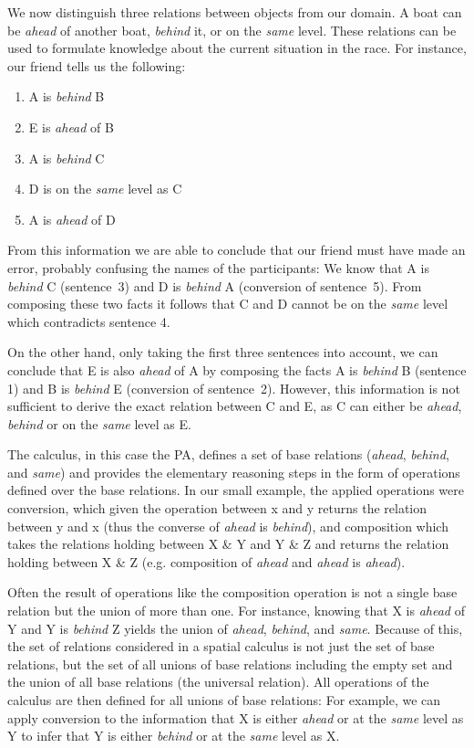 \documentclass[headsepline]{scrreprt}
\theoremstyle{definition}
\begin{document}
We now distinguish three relations between objects from
our domain. A boat can be \emph{ahead} of another boat, \emph{behind} it,
or on the \emph{same} level. These relations can be used to formulate
knowledge about the current situation in the race. For instance, our
friend tells us the following:

\begin{enumerate}
\item A is \emph{behind} B
\item E is \emph{ahead} of B
\item A is \emph{behind} C
\item D is on the \emph{same} level as C
\item A is \emph{ahead} of D
\end{enumerate}
From this information we are able to conclude that our friend must have
made an error, probably confusing the names of the participants: We know
that A is \emph{behind} C (sentence~3) and D is \emph{behind} A (conversion of sentence~5). From
composing these two facts it follows that C and D cannot be on the \emph{same}
level which contradicts sentence 4.

On the other hand, only taking the first three sentences into account, we can conclude that E
is also \emph{ahead} of A by composing
the facts A is \emph{behind} B (sentence 1) and B is \emph{behind} E (conversion of sentence~2).
However, this information is not sufficient to derive the exact
relation
between C and E, as C can either be \emph{ahead}, \emph{behind} or on the {\em
same} level as E.

The calculus, in this case the PA, defines a set of base relations
(\emph{ahead}, \emph{behind}, and \emph{same}) and
provides the elementary reasoning steps in the form of operations defined
over the base relations. In our small example, the applied
operations were conversion, which given the operation between x and y returns
the relation between y and x (thus the converse of \emph{ahead} is
\emph{behind}), and composition which takes the relations holding
between X \& Y and Y \& Z and returns the relation holding between X \& Z (e.g.
composition of \emph{ahead} and \emph{ahead} is \emph{ahead}).

Often the result of operations like the composition operation is
not a single base relation but the union of more than one. For
instance, knowing that X is \emph{ahead} of Y and Y is \emph{behind}
Z yields the union of \emph{ahead}, \emph{behind}, and \emph{same}.
Because of this, the set of relations considered in a spatial
calculus is not just the set of base relations, but the set
of all unions of base relations including the empty set and
the union of all base relations (the universal relation).
All operations of the calculus are then defined for all unions
of base relations: For example, we can apply conversion to
the information that X is either \emph{ahead} or at the
\emph{same} level as Y to infer that Y is either \emph{behind}
or at the \emph{same} level as X.
\end{document}
